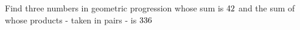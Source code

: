 
%
%
%
%
% 
% 



\DIVIDE\vbtwo\vbone\vbthree
\SQUARE\vbone\tp
\SUBTRACT\vbtwo\tp\tq
\FRACTIONSIMPLIFY\tq\vbtwo\tr\ts
\QUADEQNROOTS\ts\tr\ts\dnm\fnm\snm
{}\fnm\dnm\anm\adnm
{}\fnm\dnm\bnm\bdnm

\question[3] Find three numbers in geometric progression whose sum is $42$ and the
sum of whose products - taken in pairs - is $336$

